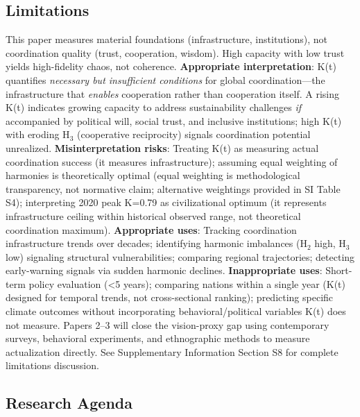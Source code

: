 \documentclass[11pt,letterpaper]{article}
\begin{document}
\subsection{Limitations}

This paper measures material foundations (infrastructure, institutions), not coordination quality (trust, cooperation, wisdom). High capacity with low trust yields high-fidelity chaos, not coherence. \textbf{Appropriate interpretation}: K(t) quantifies \textit{necessary but insufficient conditions} for global coordination---the infrastructure that \textit{enables} cooperation rather than cooperation itself. A rising K(t) indicates growing capacity to address sustainability challenges \textit{if} accompanied by political will, social trust, and inclusive institutions; high K(t) with eroding H$_3$ (cooperative reciprocity) signals coordination potential unrealized. \textbf{Misinterpretation risks}: Treating K(t) as measuring actual coordination success (it measures infrastructure); assuming equal weighting of harmonies is theoretically optimal (equal weighting is methodological transparency, not normative claim; alternative weightings provided in SI Table S4); interpreting 2020 peak K=0.79 as civilizational optimum (it represents infrastructure ceiling within historical observed range, not theoretical coordination maximum). \textbf{Appropriate uses}: Tracking coordination infrastructure trends over decades; identifying harmonic imbalances (H$_2$ high, H$_3$ low) signaling structural vulnerabilities; comparing regional trajectories; detecting early-warning signals via sudden harmonic declines. \textbf{Inappropriate uses}: Short-term policy evaluation (<5 years); comparing nations within a single year (K(t) designed for temporal trends, not cross-sectional ranking); predicting specific climate outcomes without incorporating behavioral/political variables K(t) does not measure. Papers 2--3 will close the vision-proxy gap using contemporary surveys, behavioral experiments, and ethnographic methods to measure actualization directly. See Supplementary Information Section S8 for complete limitations discussion.

\subsection{Research Agenda}
\end{document}
